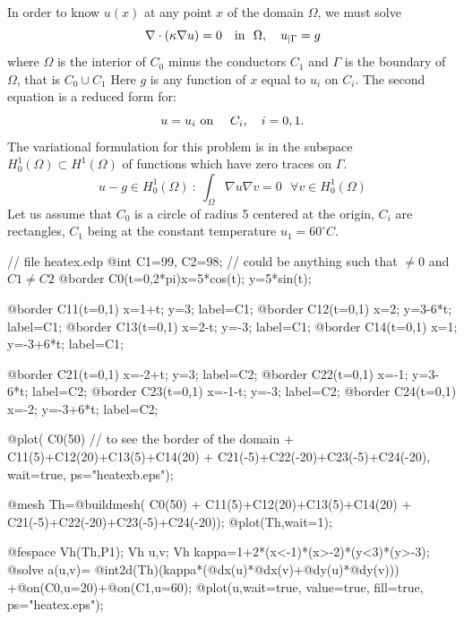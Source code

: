 \documentclass[a4paper,twoside,12pt]{book}
\def\n{\nabla}
\begin{document}
In order to know ${u} (x) $ at any point $x$ of the domain
$\Omega$, we must solve \\
 $$
 \n\cdot(\kappa\n{u})  =0 ~~ \hbox{ in }~\Omega,
 \quad {u}_{|\Gamma} =g
  $$
where $\Omega$ is the interior of $C_0$ minus the conductors $C_1$
and $\Gamma$ is the boundary of $\Omega$, that is $C_0\cup C_1 $
Here $g$ is any function of $x$ equal to  ${u}_i$ on $C_i$.
The second equation is a reduced form for: \\
$$
  {u} ={u} _{i}   \hbox{   on  }   ~~~C_{i}, \quad i=0,1.
$$
The variational formulation for this problem is in the subspace $H^1_0(\Omega)
\subset H^1(\Omega)$ of functions which have zero traces on $\Gamma$.
\[
    u-g\in H^1_0(\Omega)~:~\int_\Omega\n u\n v =0~~~\forall v\in H^1_0(\Omega)
\]
Let us assume that $C_0$ is a circle of radius 5 centered at the origin,
 $C_i$ are
rectangles, $C_1$ being at the constant temperature $u_1=60^\circ C$.



\begin{example}
\bFF
// file heatex.edp
@int C1=99, C2=98; // could be anything such that $\ne 0$ and $ C1 \ne C2$
@border C0(t=0,2*pi){x=5*cos(t); y=5*sin(t);}

@border C11(t=0,1){ x=1+t;  y=3;      label=C1;}
@border C12(t=0,1){ x=2;    y=3-6*t;  label=C1;}
@border C13(t=0,1){ x=2-t;  y=-3;     label=C1;}
@border C14(t=0,1){ x=1;    y=-3+6*t; label=C1;}

@border C21(t=0,1){ x=-2+t; y=3;      label=C2;}
@border C22(t=0,1){ x=-1;   y=3-6*t;  label=C2;}
@border C23(t=0,1){ x=-1-t; y=-3;     label=C2;}
@border C24(t=0,1){ x=-2;   y=-3+6*t; label=C2;}

@plot(    C0(50)            // to see the border of the domain
        + C11(5)+C12(20)+C13(5)+C14(20)
        + C21(-5)+C22(-20)+C23(-5)+C24(-20),
        wait=true, ps="heatexb.eps");

@mesh Th=@buildmesh(    C0(50)
                    + C11(5)+C12(20)+C13(5)+C14(20)
                    + C21(-5)+C22(-20)+C23(-5)+C24(-20));
@plot(Th,wait=1);

@fespace Vh(Th,P1); Vh u,v;
Vh kappa=1+2*(x<-1)*(x>-2)*(y<3)*(y>-3);
@solve a(u,v)= @int2d(Th)(kappa*(@dx(u)*@dx(v)+@dy(u)*@dy(v)))
                +@on(C0,u=20)+@on(C1,u=60);
@plot(u,wait=true, value=true, fill=true, ps="heatex.eps");
\eFF
\end{example}
\end{document}
